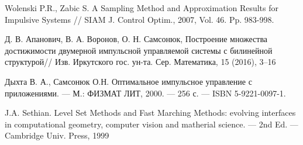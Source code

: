 \begin{thebibliography}{99}
 Wolenski P.R., Zabic S.  A Sampling Method and
  Approximation Results for Impulsive Systems // SIAM J. Control
  Optim., 2007, Vol. 46. Pp. 983-998.

 {Д. В. Апанович, В. А. Воронов, О. Н. Самсонюк},
  Построение множества достижимости двумерной импульсной управляемой
  системы с билинейной структурой// Изв. Иркутского
  гос. ун-та. Сер. Математика, 15 (2016), 3–16

 {Дыхта В. А., Самсонюк О.Н.} Оптимальное импульсное
  управление с приложениями. — М.: ФИЗМАТ ЛИТ, 2000. — 256 с. — ISBN
  5-9221-0097-1.

 {J.A. Sethian.} Level Set Methods and Fast Marching Methods: evolving
interfaces in computational geometry, computer vision and matherial
science. — 2nd Ed. — Cambridge Univ. Press, 1999

\end{thebibliography}


